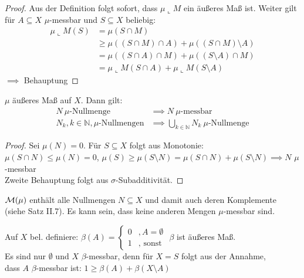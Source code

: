   \begin{proof}
    Aus der Definition folgt sofort, dass $\mu \llcorner M$ ein äußeres Maß ist. Weiter gilt für $A \subseteq X$ $\mu$-messbar und $S \subseteq X$ beliebig:
    \begin{align*}
      \mu \llcorner M(S) &= \mu (S \cap M)\\
        &\geq \mu((S \cap M) \cap A) + \mu((S \cap M) \setminus A)\\
        &= \mu ((S \cap A) \cap M) + \mu ((S \setminus A) \cap M)\\
        &= \mu \llcorner M (S \cap A) + \mu \llcorner M (S \setminus A)
    \end{align*}
    $\implies$ Behauptung
  \end{proof}

  \newpage
  \begin{theorem}
    $\mu$ äußeres Maß auf $X$. Dann gilt:
    \begin{align*}
      N \ \mu\text{-Nullmenge} &\implies N \ \mu\text{-messbar}\\
      N_k, k \in \mathbb{N}, \mu\text{-Nullmengen} &\implies \bigcup\limits_{k \in \mathbb{N}} N_k \ \mu\text{-Nullmenge}
    \end{align*}
  \end{theorem}

  \begin{proof}
    Sei $\mu(N) = 0$. Für $S \subseteq X$ folgt aus Monotonie:\\
    $\mu(S\cap N) \leq \mu(N) = 0$, $\mu(S) \geq \mu(S \setminus N) = \mu(S \cap N) + \mu(S \setminus N) \implies N$ $\mu$-messbar\\
    Zweite Behauptung folgt aus $\sigma$-Subadditivität.
  \end{proof}

  \begin{remark}
    $\mathcal{M}(\mu)$ enthält alle Nullmengen $N \subseteq X$ und damit auch deren Komplemente\\
    (siehe Satz II.7). Es kann sein, dass keine anderen Mengen $\mu$-messbar sind.
  \end{remark}

  \begin{example}
    Auf $X$ bel. definiere: $\beta(A) = \begin{cases}
      0 & , A = \emptyset\\
      1 & , \text{ sonst}
    \end{cases}$
    $\beta$ ist äußeres Maß.\\
    Es sind nur $\emptyset$ und $X$ $\beta$-messbar, denn für $X=S$ folgt aus der Annahme,\\
    dass $A$ $\beta$-messbar ist: $1 \geq \beta(A) + \beta(X \setminus A)$
  \end{example}


